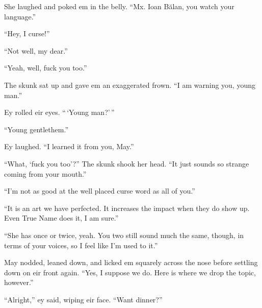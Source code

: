 She laughed and poked em in the belly. ``Mx. Ioan Bălan, you watch your language.''

``Hey, I curse!''

``Not well, my dear.''

``Yeah, well, fuck you too.''

The skunk sat up and gave em an exaggerated frown. ``I am warning you, young man.''

Ey rolled eir eyes. ``\,`Young man?'\,''

``Young gentlethem.''

Ey laughed. ``I learned it from you, May.''

``What, `fuck you too'?'' The skunk shook her head. ``It just sounds so strange coming from your mouth.''

``I'm not as good at the well placed curse word as all of you.''

``It is an art we have perfected. It increases the impact when they do show up. Even True Name does it, I am sure.''

``She has once or twice, yeah. You two still sound much the same, though, in terms of your voices, so I feel like I'm used to it.''

May nodded, leaned down, and licked em squarely across the nose before settling down on eir front again. ``Yes, I suppose we do. Here is where we drop the topic, however.''

``Alright,'' ey said, wiping eir face. ``Want dinner?''

